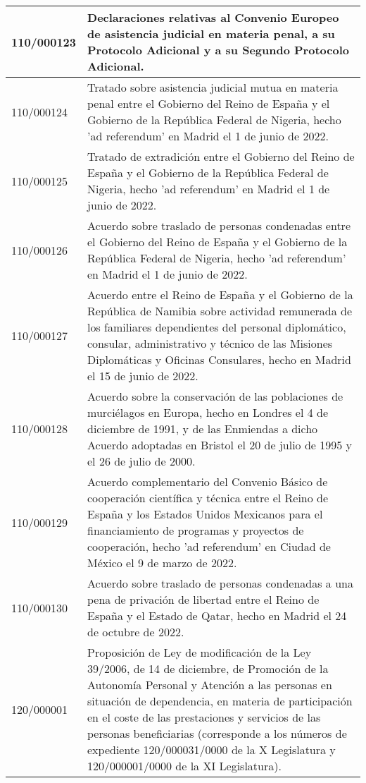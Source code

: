 {\begin{table}[H]
\begin{center}
\begin{tabularx}{\linewidth}{| l | X |}
\hline
110/000123 & Declaraciones relativas al Convenio Europeo de asistencia judicial en materia penal, a su Protocolo Adicional y a su Segundo Protocolo Adicional. \\
\hline
110/000124 & Tratado sobre asistencia judicial mutua en materia penal entre el Gobierno del Reino de España y el Gobierno de la República Federal de Nigeria, hecho 'ad referendum' en Madrid el 1 de junio de 2022. \\
\hline
110/000125 & Tratado de extradición entre el Gobierno del Reino de España y el Gobierno de la República Federal de Nigeria, hecho 'ad referendum' en Madrid el 1 de junio de 2022. \\
\hline
110/000126 & Acuerdo sobre traslado de personas condenadas entre el Gobierno del Reino de España y el Gobierno de la República Federal de Nigeria, hecho 'ad referendum' en Madrid el 1 de junio de 2022. \\
\hline
110/000127 & Acuerdo entre el Reino de España y el Gobierno de la República de Namibia sobre actividad remunerada de los familiares dependientes del personal diplomático, consular, administrativo y técnico de las Misiones Diplomáticas y Oficinas Consulares, hecho en Madrid el 15 de junio de 2022. \\
\hline
110/000128 & Acuerdo sobre la conservación de las poblaciones de murciélagos en Europa, hecho en Londres el 4 de diciembre de 1991, y de las Enmiendas a dicho Acuerdo adoptadas en Bristol el 20 de julio de 1995 y el 26 de julio de 2000. \\
\hline
110/000129 & Acuerdo complementario del Convenio Básico de cooperación científica y técnica entre el Reino de España y los Estados Unidos Mexicanos para el financiamiento de programas y proyectos de cooperación, hecho 'ad referendum' en Ciudad de México el 9 de marzo de 2022. \\
\hline
110/000130 & Acuerdo sobre traslado de personas condenadas a una pena de privación de libertad entre el Reino de España y el Estado de Qatar, hecho en Madrid el 24 de octubre de 2022. \\
\hline
120/000001 & Proposición de Ley de modificación de la Ley 39/2006, de 14 de diciembre, de Promoción de la Autonomía Personal y Atención a las personas en situación de dependencia, en materia de participación en el coste de las prestaciones y servicios de las personas beneficiarias (corresponde a los números de expediente 120/000031/0000 de la X Legislatura y 120/000001/0000 de la XI Legislatura). \\
\hline

\end{tabularx}
\end{center}
\end{table}}
